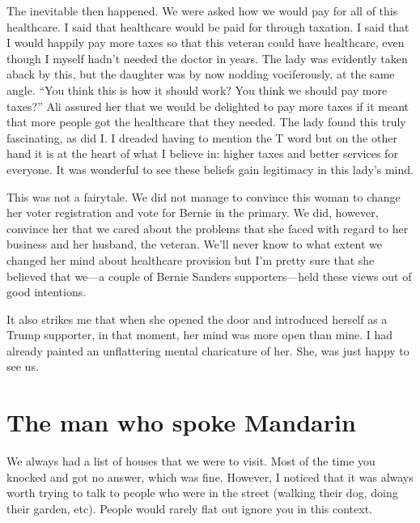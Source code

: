 \documentclass[]{book}
\begin{document}
The inevitable then happened. We were asked how we would pay for all of this healthcare. I said that healthcare would be paid for through taxation. I said that I would happily pay more taxes so that this veteran could have healthcare, even though I myself hadn't needed the doctor in years. The lady was evidently taken aback by this, but the daughter was by now nodding vociferously, at the same angle. ``You think this is how it should work? You think we should pay more taxes?'' Ali assured her that we would be delighted to pay more taxes if it meant that more people got the healthcare that they needed. The lady found this truly fascinating, as did I. I dreaded having to mention the T word but on the other hand it is at the heart of what I believe in: higher taxes and better services for everyone. It was wonderful to see these beliefs gain legitimacy in this lady's mind.

This was not a fairytale. We did not manage to convince this woman to change her voter registration and vote for Bernie in the primary. We did, however, convince her that we cared about the problems that she faced with regard to her business and her husband, the veteran. We'll never know to what extent we changed her mind about healthcare provision but I'm pretty sure that she believed that we---a couple of Bernie Sanders supporters---held these views out of good intentions.

It also strikes me that when she opened the door and introduced herself as a Trump supporter, in that moment, her mind was more open than mine. I had already painted an unflattering mental charicature of her. She, was just happy to see us.

\hypertarget{the-man-who-spoke-mandarin}{%
\section{The man who spoke Mandarin}\label{the-man-who-spoke-mandarin}}

We always had a list of houses that we were to visit. Most of the time you knocked and got no answer, which was fine. However, I noticed that it was always worth trying to talk to people who were in the street (walking their dog, doing their garden, etc). People would rarely flat out ignore you in this context.
\end{document}
